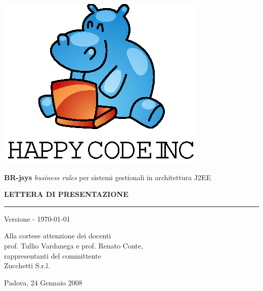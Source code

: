 \documentclass[11pt,titlepage,a4paper]{report}
\begin{document}
\begin{titlepage}
\begin{center}
\vspace*{0.5in}
\includegraphics{logo.eps}
\vspace*{0.2in}

{\Large \textbf{BR-jsys}}
{\Large \emph{business rules} per sistemi gestionali in architettura J2EE } 
\vspace{2in}

\LARGE \textbf {LETTERA DI PRESENTAZIONE}
\par\rule{10cm}{0.4pt} \par {\large Versione \lv - \today}


\end{center}
\end{titlepage}
\vspace*{0.5in}

\thispagestyle{plain}
\begin{flushright}
Alla cortese attenzione dei docenti\\
prof. Tullio Vardanega e prof. Renato Conte,\\
rappresentanti del committente\\
Zucchetti S.r.l.
\end{flushright}
Padova, 24 Gennaio 2008\\
\end{document}
